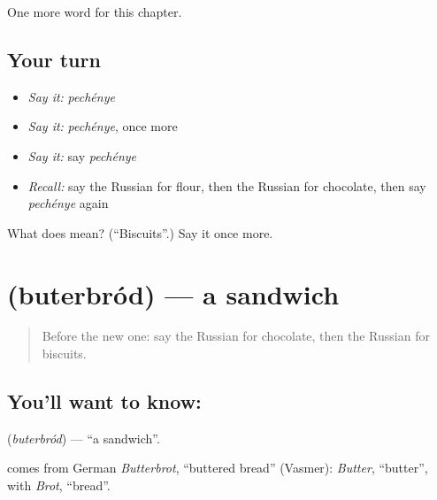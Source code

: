 \begin{grammarlens}[title={What you've built}]
One more word for this chapter.
\end{grammarlens}

\subsection*{Your turn}
\begin{itemize}
\raggedright
  \item \emph{Say it:} \emph{pechénye}
  \item \emph{Say it:} \emph{pechénye}, once more
  \item \emph{Say it:} say \emph{pechénye}
  \item \emph{Recall:} say the Russian for flour, then the Russian for chocolate, then say \emph{pechénye} again
\end{itemize}

\begin{tcolorbox}[breakable,colback=teal!4,colframe=teal!35!black,title={Before you move on}]
What does  mean? (\textquotedblleft{}Biscuits\textquotedblright{}.) Say it once more.
\end{tcolorbox}
\section[\texorpdfstring{\ru{бутерброд} (buterbród)}{бутерброд (buterbród)}]{ (buterbród) — a sandwich}

\label{lesson:RU-C105-sandwich}



\begin{quote}
Before the new one: say the Russian for chocolate, then the Russian for biscuits.
\end{quote}

\subsection*{You'll want to know: }
\textbf{} (\emph{buterbród}) — \textquotedblleft{}a sandwich\textquotedblright{}.

\begin{cousinweb}
\textbf{} comes from German \emph{Butterbrot}, \textquotedblleft{}buttered bread\textquotedblright{} (Vasmer): \emph{Butter}, \textquotedblleft{}butter\textquotedblright{}, with \emph{Brot}, \textquotedblleft{}bread\textquotedblright{}.
\end{cousinweb}

